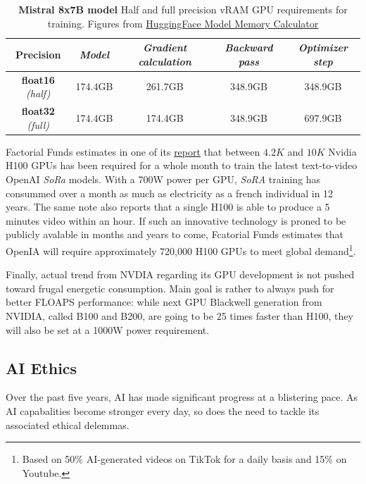 \begin{table}[htp!]
  \caption{\textbf{ Mistral 8x7B model} Half and full precision vRAM GPU requirements for training. Figures from \href{https://huggingface.co/docs/accelerate/main/en/usage_guides/model_size_estimator}{HuggingFace Model Memory Calculator}}
  \label{tab:gs-mistral_requirement}
  \centering
  \begin{adjustbox}{width=\linewidth}
  \begin{tabular}[h]{c||cccc}
  \hline 
   Precision &  \textit{Model} & \textit{Gradient calculation} & \textit{Backward pass} & \textit{Optimizer step} \\
  \hline 
  \textbf{float16} \textit{(half)} & 174.4GB  & 261.7GB & 348.9GB & 348.9GB\\
  \textbf{float32} \textit{(full)} &  174.4GB  & 174.4GB & 348.9GB & 697.9GB \\
  \hline 
  \end{tabular}
  \end{adjustbox}
\end{table}
Factorial Funds estimates in one of its \href{https://www.factorialfunds.com/blog/under-the-hood-how-openai-s-sora-model-works}{report} that between $4.2K$ and $10K$ Nvidia H100 \ac{GPU}s has been required for a whole month to train the latest text-to-video OpenAI \textit{SoRa} models. With a 700W power per \ac{GPU}, \textit{SoRA} training has consummed over a month as much as electricity as a french individual in 12 years. The same note also reports that a single H100 is able to produce a 5 minutes video within an hour. If such an innovative technology is proned to be publicly avalable in months and years to come, Fcatorial Funds estimates that OpenIA will require approximately 720,000 H100 GPUs to meet global demand\footnote{Based on 50\% \ac{AI}-generated videos on TikTok for a daily basis and 15\% on Youtube.}. 

Finally, actual trend from NVDIA regarding its \ac{GPU} development is not pushed toward frugal energetic consumption. Main goal is rather to always push for better FLOAPS performance: while next \ac{GPU} Blackwell generation from NVIDIA, called B100 and B200, are going to be 25 times faster than H100, they will also be set at a 1000W power requirement. 


\subsection{AI Ethics} 

Over the past five years, \ac{AI} has made significant progress at a blistering pace. As \ac{AI} capabalities become stronger every day, so does the need to tackle its associated ethical delemmas. 

